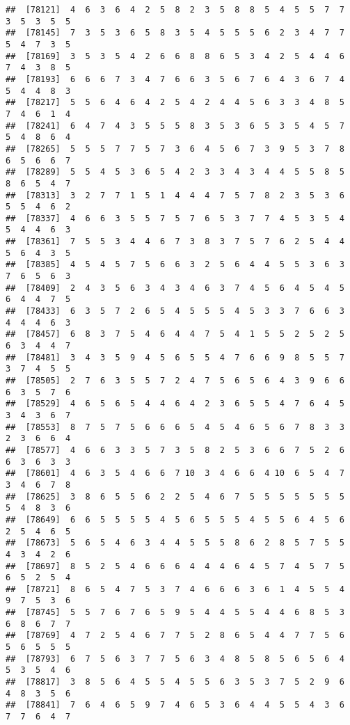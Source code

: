 \documentclass[
]{book}
\begin{document}
\begin{verbatim}
##  [78121]  4  6  3  6  4  2  5  8  2  3  5  8  8  5  4  5  5  7  7  3  5  3  5  5
##  [78145]  7  3  5  3  6  5  8  3  5  4  5  5  5  6  2  3  4  7  7  5  4  7  3  5
##  [78169]  3  5  3  5  4  2  6  6  8  8  6  5  3  4  2  5  4  4  6  7  4  3  8  5
##  [78193]  6  6  6  7  3  4  7  6  6  3  5  6  7  6  4  3  6  7  4  5  4  4  8  3
##  [78217]  5  5  6  4  6  4  2  5  4  2  4  4  5  6  3  3  4  8  5  7  4  6  1  4
##  [78241]  6  4  7  4  3  5  5  5  8  3  5  3  6  5  3  5  4  5  7  5  4  8  6  4
##  [78265]  5  5  5  7  7  5  7  3  6  4  5  6  7  3  9  5  3  7  8  6  5  6  6  7
##  [78289]  5  5  4  5  3  6  5  4  2  3  3  4  3  4  4  5  5  8  5  8  6  5  4  7
##  [78313]  3  2  7  7  1  5  1  4  4  4  7  5  7  8  2  3  5  3  6  5  5  4  6  2
##  [78337]  4  6  6  3  5  5  7  5  7  6  5  3  7  7  4  5  3  5  4  5  4  4  6  3
##  [78361]  7  5  5  3  4  4  6  7  3  8  3  7  5  7  6  2  5  4  4  5  6  4  3  5
##  [78385]  4  5  4  5  7  5  6  6  3  2  5  6  4  4  5  5  3  6  3  7  6  5  6  3
##  [78409]  2  4  3  5  6  3  4  3  4  6  3  7  4  5  6  4  5  4  5  6  4  4  7  5
##  [78433]  6  3  5  7  2  6  5  4  5  5  5  4  5  3  3  7  6  6  3  4  4  4  6  3
##  [78457]  6  8  3  7  5  4  6  4  4  7  5  4  1  5  5  2  5  2  5  6  3  4  4  7
##  [78481]  3  4  3  5  9  4  5  6  5  5  4  7  6  6  9  8  5  5  7  3  7  4  5  5
##  [78505]  2  7  6  3  5  5  7  2  4  7  5  6  5  6  4  3  9  6  6  6  3  5  7  6
##  [78529]  4  6  5  6  5  4  4  6  4  2  3  6  5  5  4  7  6  4  5  3  4  3  6  7
##  [78553]  8  7  5  7  5  6  6  6  5  4  5  4  6  5  6  7  8  3  3  2  3  6  6  4
##  [78577]  4  6  6  3  3  5  7  3  5  8  2  5  3  6  6  7  5  2  6  6  3  6  3  3
##  [78601]  4  6  3  5  4  6  6  7 10  3  4  6  6  4 10  6  5  4  7  3  4  6  7  8
##  [78625]  3  8  6  5  5  6  2  2  5  4  6  7  5  5  5  5  5  5  5  5  4  8  3  6
##  [78649]  6  6  5  5  5  5  4  5  6  5  5  5  4  5  5  6  4  5  6  2  5  4  6  5
##  [78673]  5  6  5  4  6  3  4  4  5  5  5  8  6  2  8  5  7  5  5  4  3  4  2  6
##  [78697]  8  5  2  5  4  6  6  6  4  4  4  6  4  5  7  4  5  7  5  6  5  2  5  4
##  [78721]  8  6  5  4  7  5  3  7  4  6  6  6  3  6  1  4  5  5  4  9  7  5  3  6
##  [78745]  5  5  7  6  7  6  5  9  5  4  4  5  5  4  4  6  8  5  3  6  8  6  7  7
##  [78769]  4  7  2  5  4  6  7  7  5  2  8  6  5  4  4  7  7  5  6  5  6  5  5  5
##  [78793]  6  7  5  6  3  7  7  5  6  3  4  8  5  8  5  6  5  6  4  5  3  5  4  6
##  [78817]  3  8  5  6  4  5  5  4  5  5  6  3  5  3  7  5  2  9  6  4  8  3  5  6
##  [78841]  7  6  4  6  5  9  7  4  6  5  3  6  4  4  5  5  4  3  6  7  7  6  4  7

\end{verbatim}
\end{document}
